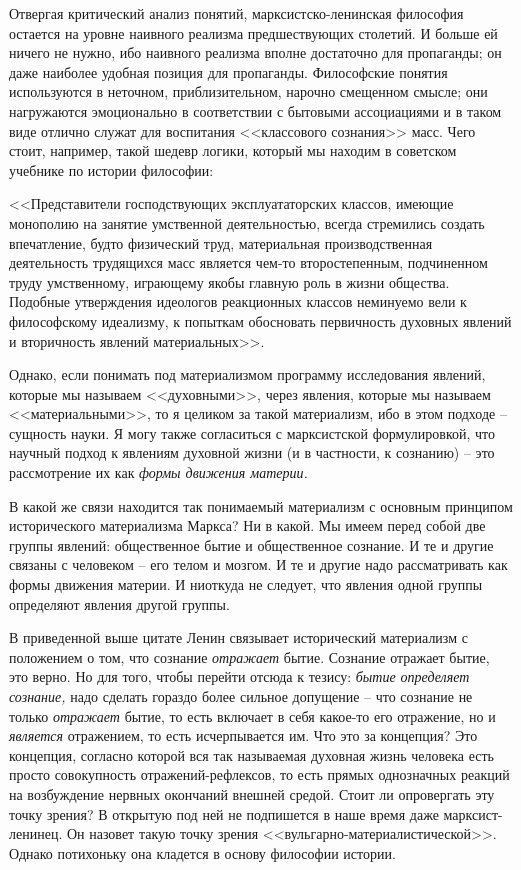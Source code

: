 \documentclass{book}
\begin{document}
Отвергая критический анализ понятий, марксистско-ленинская философия остается на уровне наивного реализма пред­шествующих 
столетий. И больше ей ничего не нужно, ибо наив­ного реализма вполне достаточно для пропаганды; он даже наиболее удобная позиция 
для пропаганды. Философские поня­тия используются в неточном, приблизительном, нарочно сме­щенном смысле; они нагружаются 
эмоционально в соответст­вии с бытовыми ассоциациями и в таком виде отлично служат для воспитания <<классового сознания>> масс. 
Чего стоит, напри­мер, такой шедевр логики, который мы находим в советском учебнике по истории философии:

<<Представители господствующих эксплуататорских классов, имеющие монополию на занятие умственной деятельностью, всегда
стремились создать впечатление, будто физический труд, материальная производственная деятельность трудящихся масс является чем-то второстепенным, подчиненном труду умствен­ному, играющему якобы главную роль в жизни общества. Подобные утверждения идеологов 
реакционных классов неми­нуемо вели к философскому идеализму, к попыткам обосно­вать первичность духовных явлений и вторичность 
явлений ма­териальных>>.%

Однако, если понимать под материализмом программу иссле­дования явлений, которые мы называем <<духовными>>, через явления,
которые мы называем <<материальными>>, то я целиком за такой материализм, ибо в этом подходе -- сущность науки. Я могу также
согласиться с марксистской формулировкой, что научный подход к явлениям духовной жизни (и в частности, к сознанию) -- это
рассмотрение их как \textit{формы движения материи.}

В какой же связи находится так понимаемый материализм с основным принципом исторического материализма Маркса?
Ни в какой. Мы имеем перед собой две группы явлений: общественное бытие и общественное сознание. И те и другие связаны с 
человеком -- его телом и мозгом. И те и другие надо рассматривать как формы движения материи. И ниоткуда не следует, что явления 
одной группы определяют явления другой группы.

В приведенной выше цитате Ленин связывает исторический материализм с положением о том, что сознание \textit{отражает}  бытие. 
Сознание отражает бытие, это верно. Но для того, чтобы перей­ти отсюда к тезису: \textit{бытие определяет сознание,}  надо 
сделать гораздо более сильное допущение -- что сознание не только \textit{от­ражает}  бытие, то есть включает в себя какое-то его 
отражение, но и \textit{является}  отражением, то есть исчерпывается им. Что это за концепция? Это концепция, согласно которой 
вся так назы­ваемая духовная жизнь человека есть просто совокупность отражений-рефлексов, то есть прямых однозначных реакций на 
возбуждение нервных окончаний внешней средой. Стоит ли опровергать эту точку зрения? В открытую под ней не подпи­шется в наше 
время даже марксист-ленинец. Он назовет такую точку зрения <<вульгарно-материалистической>>. Однако поти­хоньку она кладется в 
основу философии истории.
\end{document}
